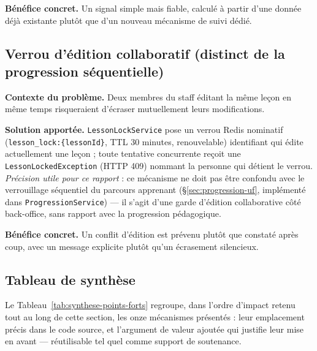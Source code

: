 \textbf{Bénéfice concret.} Un signal simple mais fiable, calculé à partir
d'une donnée déjà existante plutôt que d'un nouveau mécanisme de suivi
dédié.

\subsection{Verrou d'édition collaboratif (distinct de la progression séquentielle)}
\label{sec:verrou-edition}

\textbf{Contexte du problème.} Deux membres du staff éditant la même leçon
en même temps risqueraient d'écraser mutuellement leurs modifications.

\textbf{Solution apportée.} \texttt{LessonLockService} pose un verrou
Redis nominatif (\texttt{lesson\_lock:\{lessonId\}}, TTL 30 minutes,
renouvelable) identifiant qui édite actuellement une leçon ; toute
tentative concurrente reçoit une \texttt{LessonLockedException} (HTTP 409)
nommant la personne qui détient le verrou. \emph{Précision utile pour ce
rapport} : ce mécanisme ne doit pas être confondu avec le verrouillage
séquentiel du parcours apprenant (\S\ref{sec:progression-uf}, implémenté
dans \texttt{ProgressionService}) --- il s'agit d'une garde d'édition
collaborative côté back-office, sans rapport avec la progression
pédagogique.

\textbf{Bénéfice concret.} Un conflit d'édition est prévenu plutôt que
constaté après coup, avec un message explicite plutôt qu'un écrasement
silencieux.

\subsection{Tableau de synthèse}

Le Tableau~\ref{tab:synthese-points-forts} regroupe, dans l'ordre d'impact
retenu tout au long de cette section, les onze mécanismes présentés :
leur emplacement précis dans le code source, et l'argument de valeur
ajoutée qui justifie leur mise en avant --- réutilisable tel quel comme
support de soutenance.

